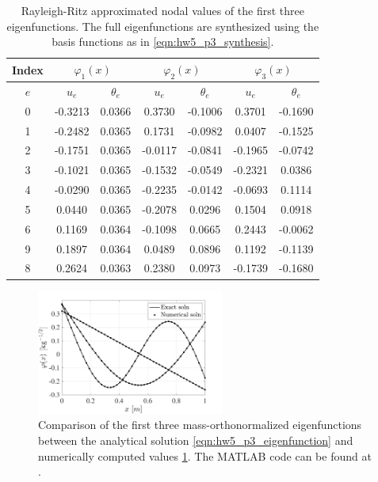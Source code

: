 \begin{enumerate}[(i)]
{    \begin{table}[!ht]
    \centering
    \begin{tabular}{|c|c|c|c|c|c|c|}
        \hline 
        Index & \multicolumn{2}{|c|}{$\varphi_1(x)$} & \multicolumn{2}{|c|}{$\varphi_2(x)$} & \multicolumn{2}{|c|}{$\varphi_3(x)$} \\ \hline 
        $e$ & $u_e$ & $\theta_e$ & $u_e$ & $\theta_e$ & $u_e$ & $\theta_e$ \\ \hline
        0 & -0.3213 & 0.0366 &  0.3730 & -0.1006 &  0.3701 & -0.1690 \\ \hline
        1 & -0.2482 & 0.0365 &  0.1731 & -0.0982 &  0.0407 & -0.1525 \\ \hline
        2 & -0.1751 & 0.0365 & -0.0117 & -0.0841 & -0.1965 & -0.0742 \\ \hline
        3 & -0.1021 & 0.0365 & -0.1532 & -0.0549 & -0.2321 &  0.0386 \\ \hline
        4 & -0.0290 & 0.0365 & -0.2235 & -0.0142 & -0.0693 &  0.1114 \\ \hline
        5 &  0.0440 & 0.0365 & -0.2078 &  0.0296 &  0.1504 &  0.0918 \\ \hline
        6 &  0.1169 & 0.0364 & -0.1098 &  0.0665 &  0.2443 & -0.0062 \\ \hline
        9 &  0.1897 & 0.0364 &  0.0489 &  0.0896 &  0.1192 & -0.1139 \\ \hline
        8 &  0.2624 & 0.0363 &  0.2380 &  0.0973 & -0.1739 & -0.1680 \\ \hline
    \end{tabular}
    \caption{Rayleigh-Ritz approximated nodal values of the first three eigenfunctions. The full eigenfunctions are synthesized using the basis functions as in \cref{eqn:hw5_p3_synthesis}.}\label{tab:hw5_p3_data}
    \end{table}
    \begin{figure}[!ht]
        \centering
        \includegraphics[width=0.55\textwidth]{homework/hw5/assets/hw5_p3_eigfunc.pdf}
        \caption{Comparison of the first three mass-orthonormalized eigenfunctions between the analytical solution \cref{eqn:hw5_p3_eigenfunction} and numerically computed values \cref{tab:hw5_p3_data}. The MATLAB code can be found at . }\label{fig:hw5_p3_eigfunc}
    \end{figure}
    
}
\end{enumerate}

